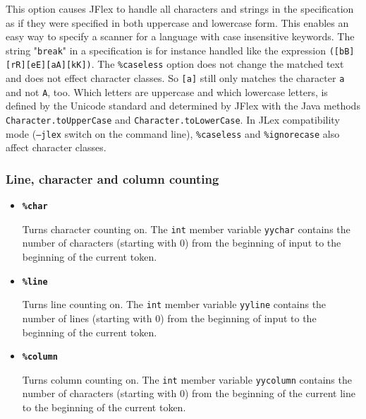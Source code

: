 \documentclass[11pt]{scrartcl}
\begin{document}
\begin{itemize}
This option causes JFlex to handle all characters and strings in the
specification as if they were specified in both uppercase and lowercase form.
This enables an easy way to specify a scanner for a language with
case insensitive keywords. The string "\texttt{break}" in a specification is for instance 
handled like the expression \texttt{([bB][rR][eE][aA][kK])}. The \texttt{\%caseless}
option does not change the matched text and does not effect character classes. So
\texttt{[a]} still only matches the character \texttt{a} and not \texttt{A}, too.
Which letters are uppercase and which lowercase letters, is defined by the Unicode standard
and determined by JFlex with the Java methods \texttt{Character.toUpperCase} and 
\texttt{Character.toLowerCase}. In JLex compatibility
mode (\texttt{--jlex} switch on the command line), \texttt{\%caseless}
and \texttt{\%ignorecase} also affect character classes.

 \end{itemize}
\subsubsection{Line, character and column counting\label{Counting}}
\begin{itemize}
\item
{\bf \texttt{\%char}}

Turns character counting on. The \texttt{int} member variable \texttt{yychar}
contains the number of characters (starting with 0) from the beginning
of input to the beginning of the current token.
 
\item
{\bf \texttt{\%line}}

Turns line counting on. The \texttt{int} member variable \texttt{yyline}
contains the number of lines (starting with 0) from the beginning of input
to the beginning of the current token.
 
\item
{\bf \texttt{\%column}}

Turns column counting on. The \texttt{int} member variable \texttt{yycolumn}
contains the number of characters (starting with 0) from the beginning
of the current line to the beginning of the current token.

 \end{itemize}
\end{document}
